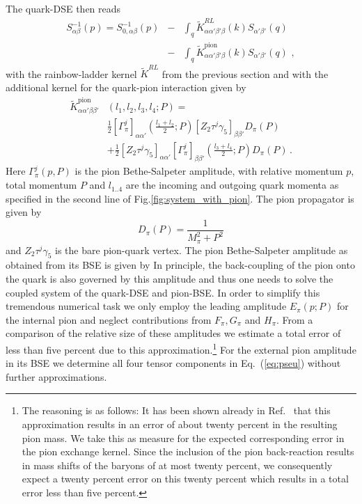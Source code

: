 The quark-DSE then reads
\begin{eqnarray}
 S^{-1}_{\alpha\beta}(p)=S^{-1}_{0,\alpha\beta}(p)&-&\int_q
\widetilde{K}_{\alpha\alpha'\beta'\beta}^{RL}(k)S_{\alpha'\beta'}(q)\nonumber\\ &-&\int_q
\widetilde{K}_{\alpha\alpha'\beta'\beta}^{\textrm{pion}}(k)S_{\alpha'\beta'}(q)\,\,,
\label{eq:quarkDSE_pi}
\end{eqnarray}
with the rainbow-ladder kernel $\widetilde{K}^{RL}$ from the previous section and with the 
additional kernel for the quark-pion interaction given by
\begin{align}\label{eq:PiKernel} 
  \widetilde{K}_{\alpha\alpha'\beta\beta'}^{\textrm{pion}}&(l_1,l_2,l_3,l_4;P)={} \nonumber\\
  &\frac{1}{2}
      [\Gamma^j_{\pi}]_{\alpha\alpha'}\left(\frac{l_1+l_2}{2};P\right)
      [Z_2 \tau^j \gamma_5]_{\beta\beta'}
       D_{\pi}(P) \nonumber\\
 & +\frac{1}{2}
      [Z_2 \tau^j \gamma_5]_{\alpha\alpha'}
      [\Gamma^j_{\pi}]_{\beta\beta'}\left( \frac{l_3+l_4}{2};P\right)
      D_{\pi}(P)    
      \,.
\end{align}
Here $\Gamma^j_{\pi}(p,P)$ is the pion Bethe-Salpeter amplitude, with relative momentum $p$,
total momentum $P$ and $l_{1..4}$ are the incoming and outgoing quark momenta as specified 
in the second line of Fig.\ref{fig:system_with_pion}. 
The pion propagator is given by
\begin{equation}\label{eq:pion_propagator}
 D_{\pi}(P)=\frac{1}{M_{\pi}^2+P^2}
\end{equation}
and $Z_2 \tau^j \gamma_5$ is the bare pion-quark vertex. 
The pion Bethe-Salpeter amplitude as obtained from its BSE is given by
In principle, the back-coupling of the pion onto the quark is also
governed by this amplitude and thus one needs to solve the coupled
system of the quark-DSE and pion-BSE. In order to simplify this 
tremendous numerical task we only employ the leading amplitude $E_\pi(p;P)$
for the internal pion and neglect contributions from $F_\pi, G_\pi$ and
$H_\pi$. From a comparison of the relative size of these amplitudes we
estimate a total error of less than five percent due to this 
approximation.\footnote{The reasoning is as follows: It has been shown
already in Ref.~\cite{Maris:1997tm} that this approximation results in an error
of about twenty percent in the resulting pion mass. We take this as measure 
for the expected corresponding error in the pion exchange kernel. Since the 
inclusion of the pion back-reaction results in mass shifts of the baryons 
of at most twenty percent, we consequently expect a twenty percent error on 
this twenty percent which results in a total error less than five percent.}
For the external pion amplitude in its BSE we determine all four tensor 
components in Eq.~(\ref{eq:pseu}) without further approximations. 


